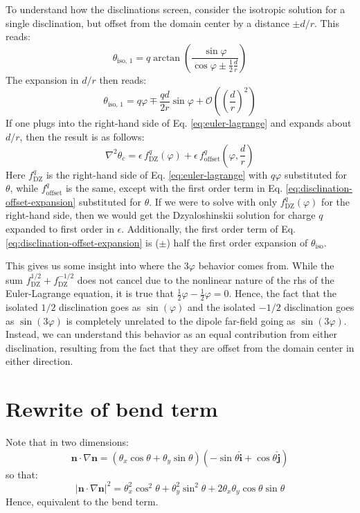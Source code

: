\documentclass[reqno]{article}
\newcommand{\n}{\mathbf{n}}
\newcommand{\ihat}{\mathbf{\hat{i}}}
\newcommand{\jhat}{\mathbf{\hat{j}}}
\begin{document}
To understand how the disclinations screen, consider the isotropic solution for a single disclination, but offset from the domain center by a distance $\pm d/r$.
This reads:
\begin{equation}
    \theta_\text{iso, 1}
    =
    q \arctan\left(\frac{\sin\varphi}{\cos\varphi \pm \tfrac12 \tfrac{d}{r}}\right)
\end{equation}
The expansion in $d/r$ then reads:
\begin{equation} \label{eq:disclination-offset-expansion}
    \theta_\text{iso, 1}
    =
    q \varphi
    \mp \frac{qd}{2r} \sin \varphi
    + \mathcal{O}\left(\left(\frac{d}{r}\right)^2 \right)
\end{equation}
If one plugs into the right-hand side of Eq. \eqref{eq:euler-lagrange} and expands about $d/r$, then the result is as follows:
\begin{equation}
    \nabla^2 \theta_c
    =
    \epsilon \, f^q_\text{DZ}(\varphi)
    + \epsilon \, f^q_\text{offset}\left(\varphi, \frac{d}{r}\right)
\end{equation}
Here $f^q_\text{DZ}$ is the right-hand side of Eq. \eqref{eq:euler-lagrange} with $q \varphi$ substituted for $\theta$, while $f^q_\text{offset}$ is the same, except with the first order term in Eq. \eqref{eq:disclination-offset-expansion} substituted for $\theta$.
If we were to solve with only $f^q_\text{DZ}(\varphi)$ for the right-hand side, then we would get the Dzyaloshinskii solution for charge $q$ expanded to first order in $\epsilon$.
Additionally, the first order term of Eq. \eqref{eq:disclination-offset-expansion} is ($\pm$) half the first order expansion of $\theta_\text{iso}$. 

This gives us some insight into where the $3\varphi$ behavior comes from. 
While the sum $f^{1/2}_\text{DZ} + f^{-1/2}_\text{DZ}$ does not cancel due to the nonlinear nature of the rhs of the Euler-Lagrange equation, it is true that $\tfrac12 \varphi - \tfrac12 \varphi = 0$.
Hence, the fact that the isolated $1/2$ disclination goes as $\sin(\varphi)$ and the isolated $-1/2$ disclination goes as $\sin(3\varphi)$ is completely unrelated to the dipole far-field going as $\sin(3 \varphi)$.
Instead, we can understand this behavior as an equal contribution from either disclination, resulting from the fact that they are offset from the domain center in either direction.

\section{Rewrite of bend term}

Note that in two dimensions:
\begin{equation}
    \n \cdot \nabla \n
    =
    \left(\theta_x \cos\theta  + \theta_y \sin\theta  \right) \left( -\sin\theta \ihat + \cos\theta \jhat\right)
\end{equation}
so that:
\begin{equation}
    \left| \n \cdot \nabla \n \right|^2
    =
    \theta_x^2 \cos^2\theta
    + \theta_y^2 \sin^2\theta
    + 2 \theta_x \theta_y \cos\theta \sin\theta
\end{equation}
Hence, equivalent to the bend term.
\end{document}

